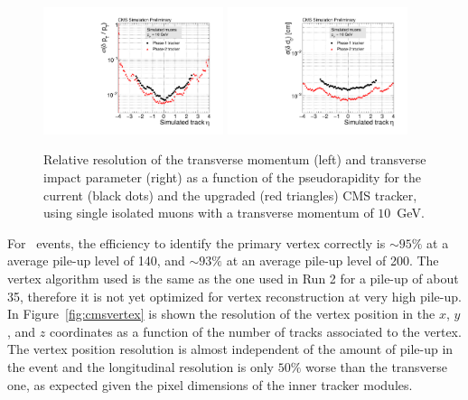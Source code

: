 \begin{figure}[h!tbp]
\begin{center}
  \includegraphics[width=0.47\textwidth]{figures/cmsupgrade/TDR-17-001_fig6_12_a_ptres_vs_eta_Sigma_vsPhase1.pdf} \hfill
  \includegraphics[width=0.47\textwidth]{figures/cmsupgrade/TDR-17-001_fig6_12_b_dxyres_vs_eta_Sigma_vsPhase1.pdf}
  \caption{Relative resolution of the transverse momentum (left) and transverse impact parameter (right) as a function of the pseudorapidity for the current (black dots) and the upgraded (red triangles) CMS tracker, using single isolated muons with a transverse momentum of $10$~GeV.}
  \label{fig:cmstrackres}
\end{center}
\end{figure}

For \ttbar~events, the efficiency to identify the primary vertex correctly is $\sim 95\%$ at a average pile-up level of 140, and $\sim93\%$ at an average pile-up level of 200. The vertex algorithm used is the same as the one used in Run 2 for a pile-up of about 35, therefore it is not yet optimized for vertex reconstruction at very high pile-up. In Figure~\ref{fig:cmsvertex} is shown the resolution of the vertex position in the $x$, $y$, and $z$ coordinates as a function of the number of tracks associated to the vertex. The vertex position resolution is almost independent of the amount of pile-up in the event and the longitudinal resolution is only $50\%$ worse than the transverse one, as expected given the pixel dimensions of the inner tracker modules.

